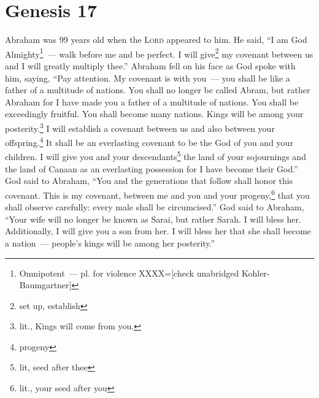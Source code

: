 \section{Genesis 17}\label{Genesis 17}
\begin{enumerate}[align=center]
     Abraham was 99 years old when the \textsc{Lord} appeared to him. He said, ``I am God Almighty\footnote{Omnipotent~--- pl. for violence XXXX=[check unabridged Kohler-Baumgartner]}~--- walk before me and be perfect.%
     I will give\footnote{set up, establish} my covenant between us and I will greatly multiply thee.''%
     Abraham fell on his face as God spoke with him, saying,%
     ``Pay attention. My covenant is with you~--- you shall be like a father of a multitude of nations.%
     You shall no longer be called Abram, but rather Abraham for I have made you a father of a multitude of nations.%
     You shall be exceedingly fruitful. You shall become many nations. Kings will be among your posterity.\footnote{lit., Kings will come from you.}%
     I will establish a covenant between us and also between your offspring.\footnote{progeny} It shall be an everlasting covenant to be the God of you and your children.%
     I will give you and your descendants\footnote{lit, seed after thee} the land of your sojournings and the land of Canaan as an everlasting possession for I have become their God.''%
     God said to Abraham, ``You and the generations that follow shall honor this covenant.%
     This is my covenant, between me and you and your progeny,\footnote{lit., your seed after you} that you shall observe carefully: every male shall be circumcised.''%
     God said to Abraham, ``Your wife will no longer be known as Sarai, but rather Sarah.%
     I will bless her. Additionally, I will give you a son from her. I will bless her that she shall become a nation~--- people's kings will be among her posterity.''%
\end{enumerate}
